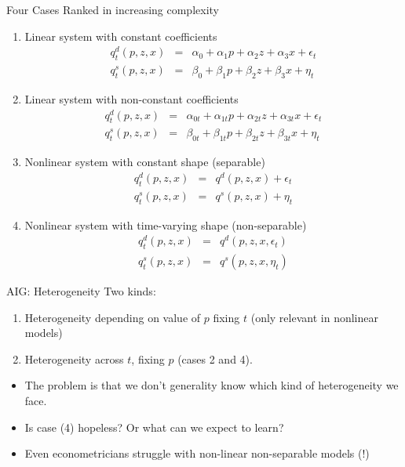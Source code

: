 \documentclass[aspectratio=169,11pt]{beamer}
\begin{document}
\begin{frame}{Four Cases}
Ranked in increasing complexity
\footnotesize
\begin{enumerate}
\item Linear system with constant coefficients
\begin{eqnarray*}
q_t^d(p,z,x) &=& \alpha_0 + \alpha_1 p + \alpha_2 z + \alpha_3 x + \epsilon_t \\
q_t^s(p,z,x) &=& \beta_0 + \beta_1 p + \beta_2 z + \beta_3 x + \eta_t
\end{eqnarray*}
\item Linear system with non-constant coefficients
\begin{eqnarray*}
q_t^d(p,z,x) &=& \alpha_{0t} + \alpha_{1t} p + \alpha_{2t} z + \alpha_{3t} x + \epsilon_t \\
q_t^s(p,z,x) &=& \beta_{0t} + \beta_{1t} p + \beta_{2t} z + \beta_{3t} x + \eta_t
\end{eqnarray*}
\item Nonlinear system with constant shape (separable)
\begin{eqnarray*}
q_t^d(p,z,x) &=& q^d(p,z,x)+ \epsilon_t \\
q_t^s(p,z,x) &=& q^s(p,z,x)+ \eta_t
\end{eqnarray*}
\item Nonlinear system with time-varying shape (non-separable)
\begin{eqnarray*}
q_t^d(p,z,x) &=& q^d(p,z,x,\epsilon_t) \\
q_t^s(p,z,x) &=& q^s(p,z,x,\eta_t)
\end{eqnarray*}
\end{enumerate}
\end{frame}

\begin{frame}{AIG: Heterogeneity}
Two kinds:
\begin{enumerate}
\item Heterogeneity depending on value of $p$ fixing $t$ (only relevant in nonlinear models)
\item Heterogeneity across $t$, fixing $p$ (cases 2 and 4).
\end{enumerate}
\begin{itemize}
\item The problem is that we don't generality know which kind of heterogeneity we face.
\item Is case (4) hopeless? Or what can we expect to learn?
\item Even econometricians struggle with non-linear non-separable models (!)
\end{itemize}
\end{frame}
\end{document}
